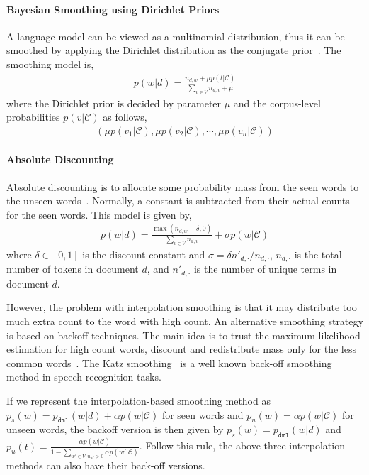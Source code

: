 \paragraph{Bayesian Smoothing using Dirichlet Priors}

A language model can be viewed as a multinomial distribution, thus it can be smoothed by applying the Dirichlet distribution as the conjugate prior~\citep{mackay95dirichlet}. The smoothing model is,
\begin{align}
p(w|d) = \frac{n_{d,w} + \mu p(t|\mathcal{C})}{\sum_{v \in V} n_{d,v} + \mu}
\end{align}
where the Dirichlet prior is decided by parameter $\mu$ and the corpus-level probabilities $p(v|\mathcal{C})$ as follows,
\begin{align}
(\mu p(v_1 | \mathcal{C}), \mu p(v_2 | \mathcal{C}), \cdots, \mu p(v_n | \mathcal{C}))
\label{eq:lm-bs}
\end{align}

\paragraph{Absolute Discounting}

Absolute discounting is to allocate some probability mass from the seen words to the unseen words~\cite{Ney-1994}. Normally, a constant is subtracted from their actual counts for the seen words. This model is given by,
\begin{align}
p(w|d) = \frac{\max(n_{d,w} - \delta, 0)}{\sum_{v \in V} n_{d,v}} + \sigma p(w|\mathcal{C})
\end{align}
where $\delta \in [0,1]$ is the discount constant and $\sigma = \delta n'_{d,\cdot} / n_{d, \cdot}$, $n_{d, \cdot}$ is the total number of tokens in document $d$, and $n'_{d,\cdot}$ is the number of unique terms in document $d$. 

However, the problem with interpolation smoothing is that it may distribute too much extra count to the word with high count. An alternative smoothing strategy is based on backoff techniques. The main idea is to trust the maximum likelihood estimation for high count words, discount and  redistribute mass only for the less common words~\cite{zhai-01}. The Katz smoothing~\citep{katz-87} is a well known back-off smoothing method in speech recognition tasks. 

If we represent the interpolation-based smoothing method as $p_s(w) = p_{\texttt{dml}}(w|d) + \alpha p(w|\mathcal{C})$ for seen words and $p_u(w) = \alpha p(w|\mathcal{C})$ for unseen words, the backoff version is then given by $p_s(w) = p_{\texttt{dml}}(w|d)$ and $p_u(t) = \frac{\alpha p(w|\mathcal{C})}{1-\sum_{w' \in V: n_{w'}>0} \alpha p(w'|\mathcal{C})}$. Follow this rule, the above three interpolation methods can also have their back-off versions.

